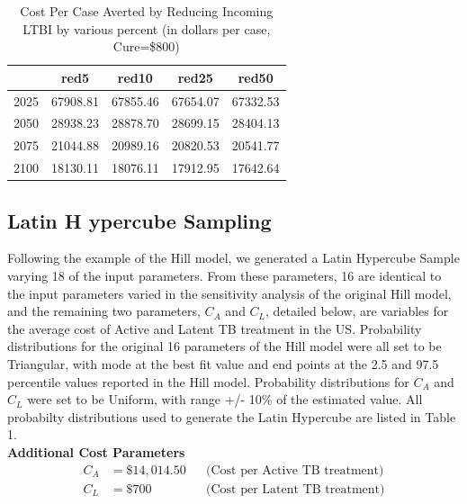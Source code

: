 \documentclass{amsart}
\begin{document}
\begin{table}
\centering
\begin{tabular}{|r|cccc|} \hline
       & red5     & red10    & red25    & red50    \\ \hline
  2025 & 67908.81 & 67855.46 & 67654.07 & 67332.53 \\ 
  2050 & 28938.23 & 28878.70 & 28699.15 & 28404.13 \\ 
  2075 & 21044.88 & 20989.16 & 20820.53 & 20541.77 \\ 
  2100 & 18130.11 & 18076.11 & 17912.95 & 17642.64 \\ \hline
\end{tabular}
\caption{Cost Per Case Averted by Reducing Incoming LTBI by various percent (in
dollars per case, Cure=\$800)} 
\label{tab:cpcaRed}
\end{table}

\subsection{Latin H ypercube Sampling}
\label{subsec:lhs}
Following the example of the
Hill model, we generated a Latin Hypercube Sample varying 18 of the input
parameters.  From these parameters, 16 are identical to the input parameters
varied in the sensitivity analysis of the original Hill model, and the remaining
two parameters, $C_{A}$ and $C_{L}$, detailed below, are variables for the average cost of
Active and Latent TB treatment in the US.   Probability distributions for the
original 16 parameters of the Hill model were all set to be Triangular, with
mode at the best fit value and end points at the 2.5 and 97.5 percentile values
reported in the Hill model.  Probability distributions for $C_{A}$ and $C_{L}$
were set to be Uniform, with range +/- 10\% of the estimated value.  All
probabilty distributions used to generate the Latin Hypercube are listed in
Table 1.\\

{\bf Additional Cost Parameters}
\begin{align*}
  C_{A} &= \$14,014.50 &&\text{(Cost per Active TB treatment)}\\
  C_{L} &= \$700       &&\text{(Cost per Latent TB treatment)}
\end{align*}
\vspace{5mm}
\end{document}
